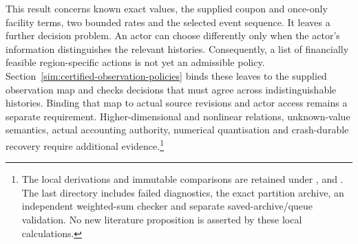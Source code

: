 This result concerns known exact values, the supplied coupon and once-only facility terms, two bounded rates and the selected event sequence. It leaves a further decision problem. An actor can choose differently only when the actor's information distinguishes the relevant histories. Consequently, a list of financially feasible region-specific actions is not yet an admissible policy. Section~\ref{sim:certified-observation-policies} binds these leaves to the supplied observation map and checks decisions that must agree across indistinguishable histories. Binding that map to actual source revisions and actor access remains a separate requirement. Higher-dimensional and nonlinear relations, unknown-value semantics, actual accounting authority, numerical quantisation and crash-durable recovery require additional evidence.\footnote{The local derivations and immutable comparisons are retained under ,  and . The last directory includes failed diagnostics, the exact partition archive, an independent weighted-sum checker and separate saved-archive/queue validation. No new literature proposition is asserted by these local calculations.}
